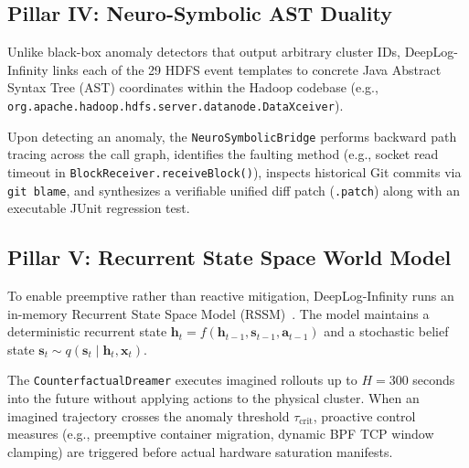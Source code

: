 \documentclass[letterpaper,twocolumn,10pt]{article}
\begin{document}
\subsection{Pillar IV: Neuro-Symbolic AST Duality}
Unlike black-box anomaly detectors that output arbitrary cluster IDs, DeepLog-Infinity links each of the 29 HDFS event templates to concrete Java Abstract Syntax Tree (AST) coordinates within the Hadoop codebase (e.g., \texttt{org.\allowbreak apache.\allowbreak hadoop.\allowbreak hdfs.\allowbreak server.\allowbreak datanode.\allowbreak DataXceiver}). 

Upon detecting an anomaly, the \texttt{Neuro\allowbreak Symbolic\allowbreak Bridge} performs backward path tracing across the call graph, identifies the faulting method (e.g., socket read timeout in \texttt{BlockReceiver.\allowbreak receiveBlock()}), inspects historical Git commits via \texttt{git blame}, and synthesizes a verifiable unified diff patch (\texttt{.patch}) along with an executable JUnit regression test.

\subsection{Pillar V: Recurrent State Space World Model}
To enable preemptive rather than reactive mitigation, DeepLog-Infinity runs an in-memory Recurrent State Space Model (RSSM)~\cite{hafner2020dreamer}. The model maintains a deterministic recurrent state $\mathbf{h}_t = f(\mathbf{h}_{t-1}, \mathbf{s}_{t-1}, \mathbf{a}_{t-1})$ and a stochastic belief state $\mathbf{s}_t \sim q(\mathbf{s}_t \mid \mathbf{h}_t, \mathbf{x}_t)$. 

The \texttt{Counterfactual\allowbreak Dreamer} executes imagined rollouts up to $H = 300$ seconds into the future without applying actions to the physical cluster. When an imagined trajectory crosses the anomaly threshold $\tau_{\text{crit}}$, proactive control measures (e.g., preemptive container migration, dynamic BPF TCP window clamping) are triggered before actual hardware saturation manifests.
\end{document}

